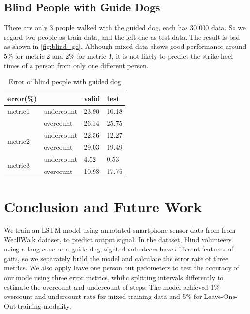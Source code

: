 \documentclass[11pt]{article}
\begin{document}
{\subsection{Blind People with Guide Dogs}

There are only 3 people walked with the guided dog, each has 30,000 data. So we regard two people as train data, and the left one as test data. The result is bad as shown in \ref{fig:blind_gd}. Although mixed data shows good performance around 5\% for metric 2 and 2\% for metric 3, it is not likely to predict the strike heel times of a person from only one different person.

\begin{table}[]
\centering
\caption{Error of blind people with guided dog}
\label{my-label}
\begin{tabular}{llll}
\hline
error(\%)                &            & valid & test  \\ \hline
metric1                  & undercount & 23.90 & 10.18 \\
                         & overcount  & 26.14 & 25.75 \\ \hline
\multirow{2}{*}{metric2} & undercount & 22.56 & 12.27 \\
                         & overcount  & 29.03 & 19.49 \\ \hline
\multirow{2}{*}{metric3} & undercount & 4.52  & 0.53  \\
                         & overcount  & 10.98 & 17.75 \\ \hline
\end{tabular}
\end{table}


\section{Conclusion and Future Work}

We train an LSTM model using annotated smartphone sensor data from from WeallWalk dataset, to predict output signal. In the dataset, blind volunteers using a long cane or a guide dog, sighted volunteers have different features of gaits, so we separately build the model and calculate the error rate of three metrics. We also apply leave one person out pedometers to test the accuracy of our mode using three error metrics, whihc splitting intervals differently to estimate the overcount and undercount of steps.  The model achieved 1\% overcount and undercount rate for mixed training data and 5\% for Leave-One-Out training modality.

}
\end{document}
